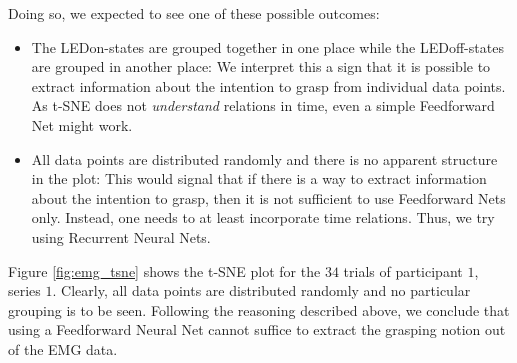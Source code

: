 \documentclass{article} %
\begin{document}
Doing so, we expected to see one of these possible outcomes:
\begin{itemize}
	\item The LEDon-states are grouped together in one place while the LEDoff-states are grouped in another place:
	We interpret this a sign that it is possible to extract information about the intention to grasp from individual data points. As t-SNE does not \emph{understand} relations in time, even a simple Feedforward Net might work.
	\item All data points are distributed randomly and there is no apparent structure in the plot:
	This would signal that if there is a way to extract information about the intention to grasp, then it is not sufficient to use Feedforward Nets only. Instead, one needs to at least incorporate time relations. Thus, we try using Recurrent Neural Nets.
\end{itemize}
Figure \ref{fig:emg_tsne} shows the t-SNE plot for the $34$ trials of participant $1$, series $1$. Clearly, all data points are distributed randomly and no particular grouping is to be seen. Following the reasoning described above, we conclude that using a Feedforward Neural Net cannot suffice to extract the grasping notion out of the EMG data.
\end{document}
